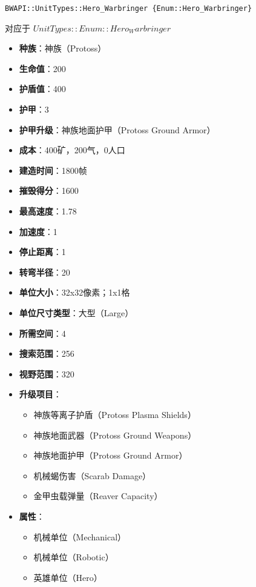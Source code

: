 \begin{tcolorbox}[colback=white, colframe=black!60!white, title=Hero\_Warbringer(), arc=0mm]
    \begin{verbatim}
BWAPI::UnitTypes::Hero_Warbringer {Enum::Hero_Warbringer}
    \end{verbatim}
    对应于  $ UnitTypes::Enum::Hero_Warbringer $ 
    \begin{itemize}
        \item \textbf{种族}：神族（Protoss）
        \item \textbf{生命值}：200
        \item \textbf{护盾值}：400
        \item \textbf{护甲}：3
        \item \textbf{护甲升级}：神族地面护甲（Protoss Ground Armor）
        \item \textbf{成本}：400矿，200气，0人口
        \item \textbf{建造时间}：1800帧
        \item \textbf{摧毁得分}：1600
        \item \textbf{最高速度}：1.78
        \item \textbf{加速度}：1
        \item \textbf{停止距离}：1
        \item \textbf{转弯半径}：20
        \item \textbf{单位大小}：32x32像素；1x1格
        \item \textbf{单位尺寸类型}：大型（Large）
        \item \textbf{所需空间}：4
        \item \textbf{搜索范围}：256
        \item \textbf{视野范围}：320
        \item \textbf{升级项目}：
            \begin{itemize}
                \item 神族等离子护盾（Protoss Plasma Shields）
                \item 神族地面武器（Protoss Ground Weapons）
                \item 神族地面护甲（Protoss Ground Armor）
                \item 机械蝎伤害（Scarab Damage）
                \item 金甲虫载弹量（Reaver Capacity）
            \end{itemize}
        \item \textbf{属性}：
            \begin{itemize}
                \item 机械单位（Mechanical）
                \item 机械单位（Robotic）
                \item 英雄单位（Hero）
            \end{itemize}
    \end{itemize}
\end{tcolorbox}

